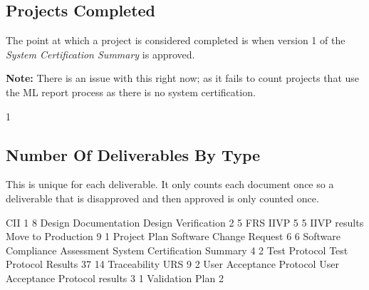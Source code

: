 \documentclass{article}
\begin{document}
\subsection{Projects Completed}

The point at which a project is considered completed is when version 1 of the
\textit{System Certification Summary} is approved.

\textbf{Note:} There is an issue with this right now; as it fails to count projects
that use the ML report process as there is no system certification.

\begin{Schunk}
\begin{Soutput}
[1] 1
\end{Soutput}
\end{Schunk}


\subsection{Number Of Deliverables By Type}
This is unique for each deliverable. It only counts each document once so a deliverable
that is disapproved and then approved is only counted once.

\begin{Schunk}
\begin{Soutput}
                                                              CII 
                               1                                8 
            Design Documentation              Design Verification 
                               2                                5 
                             FRS                             IIVP 
                               5                                5 
                    IIVP results               Move to Production 
                               9                                1 
                    Project Plan          Software Change Request 
                               6                                6 
  Software Compliance Assessment     System Certification Summary 
                               4                                2 
                   Test Protocol            Test Protocol Results 
                              37                               14 
                    Traceability                              URS 
                               9                                2 
        User Acceptance Protocol User Acceptance Protocol results 
                               3                                1 
                 Validation Plan 
                               2 
\end{Soutput}
\end{Schunk}
\end{document}
